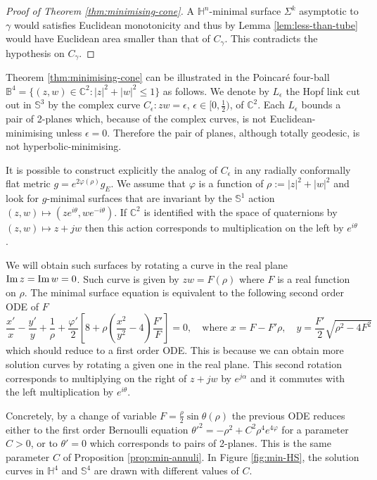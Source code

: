 \documentclass[11pt]{article}
\newcommand{\im}{\mathop{\rm Im}\nolimits}
\begin{document}
\begin{proof}[Proof of Theorem \ref{thm:minimising-cone}]
A \(\mathbb{H}^n\)-minimal surface \(\Sigma^k\) asymptotic to \(\gamma\) would satisfies Euclidean
monotonicity and thus by Lemma \ref{lem:less-than-tube} would have Euclidean area smaller
than that of \(C_\gamma\). This contradicts the hypothesis on \(C_\gamma\).
\end{proof}

Theorem \ref{thm:minimising-cone} can be illustrated in the Poincaré four-ball \(\mathbb{B}^4=\{(z,w)\in \mathbb{C}^2:|z|^2+|w|^2 \leq 1\}\) as follows. We denote by \(L_\epsilon\)
the Hopf link cut out in \(\mathbb{S}^3\) by the complex curve \(C_\epsilon: zw=\epsilon\), \(\epsilon\in [0, \frac{1}{2})\), of \(\mathbb{C}^2\). Each \(L_\epsilon\) bounds a
pair of 2-planes which, because of the complex curves, is not
Euclidean-minimising unless \(\epsilon=0\). Therefore the pair of planes, although
totally geodesic, is not hyperbolic-minimising.

It is possible to construct explicitly the analog of \(C_\epsilon\) in any radially
conformally flat metric \(g =
e^{2\varphi(\rho)} g_E\). We assume that \(\varphi\) is a function of \(\rho:=|z|^2 + |w|^2\) and look for \(g\)-minimal surfaces 
that are invariant by the \(\mathbb{S}^1\) action \((z,w)\mapsto(ze^{i\theta}, we^{-i\theta})\). If \(\mathbb{C}^2\) is identified with the
space of quaternions by \((z,w) \mapsto z + jw\) then this action corresponds to
multiplication on the left by \(e^{i\theta}\). 

We will obtain such surfaces by rotating a curve in the real plane \(\im z = \im w = 0\). Such curve is given by \(zw = F(\rho)\) 
where \(F\) is a real function on \(\rho\). The minimal surface
equation is equivalent to the following second order ODE of \(F\)
\[
 \frac{x'}{x} - \frac{y'}{y} + \frac{1}{\rho} +
\frac{\varphi'}{2}\left[8+\rho\left(\frac{x^2}{y^2}-4\right)\frac{F'}{F}
\right]=0,\quad\text{where }x=F-F'\rho,\quad y = \frac{F'}{2}\sqrt{\rho^2 - 4F^2}
\]
which should reduce to a first order ODE. This is because we can obtain more solution
curves by rotating a given one in the real plane. This second rotation corresponds to 
multiplying on the right of \(z+jw\) by \(e^{j\alpha}\) and it commutes with the left
multiplication by \(e^{i\theta}\).

Concretely, by a change of variable \(F=\frac{\rho}{2}\sin\theta(\rho)\) the previous ODE reduces either to the first order Bernoulli equation
\(\theta'^2 = -\rho^2 + C^2\rho^4 e^{4\varphi}\) for a parameter \(C > 0\),
or to \(\theta'=0\) which corresponds to pairs of 2-planes. This is the same parameter
\(C\) of Proposition \ref{prop:min-annuli}.
In Figure \ref{fig:min-HS}, the solution curves in \(\mathbb{H}^4\) and \(\mathbb{S}^4\) are drawn with different
values of \(C\).
\end{document}
